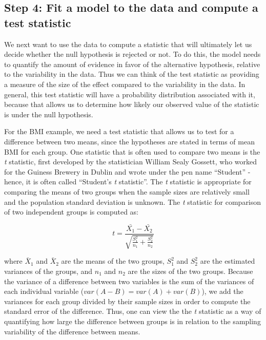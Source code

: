 \documentclass[12pt,]{book}
\theoremstyle{definition}
\theoremstyle{definition}
\theoremstyle{definition}
\theoremstyle{remark}
\begin{document}
\hypertarget{step-4-fit-a-model-to-the-data-and-compute-a-test-statistic}{%
\subsection{Step 4: Fit a model to the data and compute a test statistic}\label{step-4-fit-a-model-to-the-data-and-compute-a-test-statistic}}

We next want to use the data to compute a statistic that will ultimately let us decide whether the null hypothesis is rejected or not. To do this, the model needs to quantify the amount of evidence in favor of the alternative hypothesis, relative to the variability in the data. Thus we can think of the test statistic as providing a measure of the size of the effect compared to the variability in the data. In general, this test statistic will have a probability distribution associated with it, because that allows us to determine how likely our observed value of the statistic is under the null hypothesis.

For the BMI example, we need a test statistic that allows us to test for a difference between two means, since the hypotheses are stated in terms of mean BMI for each group. One statistic that is often used to compare two means is the \emph{t} statistic, first developed by the statistician William Sealy Gossett, who worked for the Guiness Brewery in Dublin and wrote under the pen name ``Student'' - hence, it is often called ``Student's \emph{t} statistic''. The \emph{t} statistic is appropriate for comparing the means of two groups when the sample sizes are relatively small and the population standard deviation is unknown. The \emph{t} statistic for comparison of two independent groups is computed as:

\[
t = \frac{\bar{X_1} - \bar{X_2}}{\sqrt{\frac{S_1^2}{n_1} + \frac{S_2^2}{n_2}}}
\]

where \(\bar{X}_1\) and \(\bar{X}_2\) are the means of the two groups, \(S^2_1\) and \(S^2_2\) are the estimated variances of the groups, and \(n_1\) and \(n_2\) are the sizes of the two groups. Because the variance of a difference between two variables is the sum of the variances of each individual variable (\(var(A - B) = var(A) + var(B)\)), we add the variances for each group divided by their sample sizes in order to compute the standard error of the difference. Thus, one can view the the \emph{t} statistic as a way of quantifying how large the difference between groups is in relation to the sampling variability of the difference between means.
\end{document}
